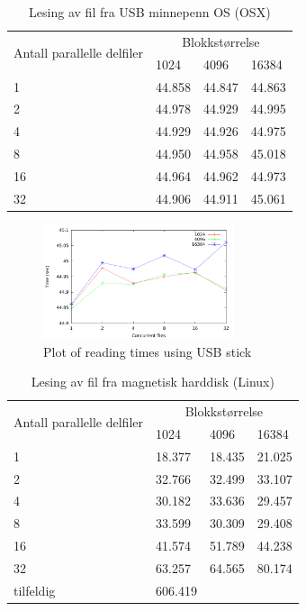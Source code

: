 \documentclass[titlepage]{article}
\begin{document}
\begin{table}%
\caption{Lesing av fil fra USB minnepenn OS (OSX)}
\label{USB}
\centering
\begin{tabular}{|l|l|l|l|}
\hline
\multirow{2}{*}{ Antall parallelle delfiler} & \multicolumn{3}{|c|}{Blokkstørrelse} \\
 & 1024 & 4096 & 16384\\
\hline
1         & 44.858 & 44.847 & 44.863\\
2         & 44.978 & 44.929 & 44.995\\
4         & 44.929 & 44.926 & 44.975\\
8         & 44.950 & 44.958 & 45.018\\
16        & 44.964 & 44.962 & 44.973\\
32        & 44.906 & 44.911 & 45.061\\
\hline
\end{tabular}
\end{table}

\begin{figure}%
  \caption{Plot of reading times using USB stick}
  \label{fig:usb}
  \centering
  \includegraphics[width=0.5\textwidth]{res/result-usb}
\end{figure}

\begin{table}%
\caption{Lesing av fil fra magnetisk harddisk (Linux)}
\label{HDD}
\centering
\begin{tabular}{|l|l|l|l|}
\hline
\multirow{2}{*}{ Antall parallelle delfiler} & \multicolumn{3}{|c|}{Blokkstørrelse} \\
 & 1024 & 4096 & 16384\\
\hline
1         & 18.377  & 18.435 & 21.025 \\
2         & 32.766  & 32.499 & 33.107 \\
4         & 30.182  & 33.636 & 29.457 \\
8         & 33.599  & 30.309 & 29.408 \\
16        & 41.574  & 51.789 & 44.238 \\
32        & 63.257  & 64.565 & 80.174 \\
tilfeldig & 606.419 &        &        \\
\hline
\end{tabular}
\end{table}
\end{document}
